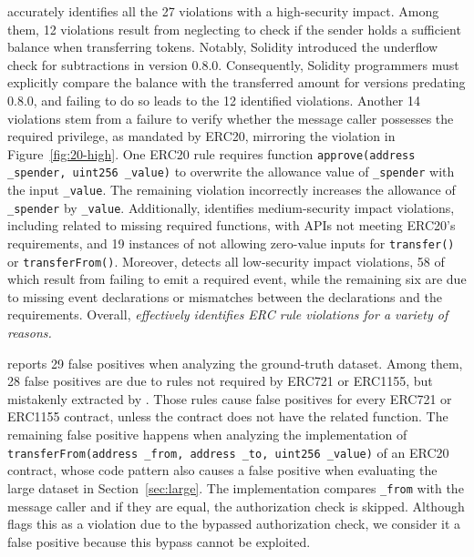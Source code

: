 accurately identifies all the 27 violations with a high-security impact. 
Among them, 12 violations result from neglecting 
to check if the sender holds a sufficient balance 
when transferring tokens. Notably, Solidity 
introduced the underflow check for subtractions 
in version 0.8.0. Consequently, Solidity 
programmers must explicitly compare the balance with 
the transferred amount for versions predating 0.8.0, 
and failing to do so leads to the 12 identified 
violations.
Another 14 violations stem from a failure to verify whether the message caller possesses the required privilege, as mandated by ERC20,
mirroring the violation in Figure~\ref{fig:20-high}. 
One ERC20 rule requires function \texttt{approve(address \_spender, uint256 \_value)} to overwrite the allowance value of \texttt{\_spender}
with the input \texttt{\_value}.
The remaining violation incorrectly increases the allowance of \texttt{\_spender} by \texttt{\_value}.  
Additionally, \Tool{} identifies   medium-security impact violations, 
including  related to missing required functions, 
 with APIs not meeting ERC20's requirements, 
and 19 instances of not allowing zero-value inputs for \texttt{transfer()} 
or \texttt{transferFrom()}. Moreover, \Tool{} detects all low-security impact violations, 
58 of which result from failing to emit a required event, 
while the remaining six are due to missing event declarations 
or mismatches between the declarations and the requirements. 
Overall, \textit{\Tool{} effectively identifies ERC rule violations for a variety of reasons.}

\fi



\Tool{} reports 29 false positives when analyzing the ground-truth dataset. Among them, 28 false positives are due to rules not required 
by ERC721 or ERC1155, but mistakenly extracted by \Tool{}. 
Those rules cause false positives for every ERC721 or ERC1155 contract, 
unless the contract does not have the related function. 
The remaining false positive happens when analyzing 
the implementation of \texttt{transferFrom(address \_from, address \_to, uint256 \_value)} of an ERC20 contract,
whose code pattern also causes a false positive when evaluating the large dataset
in Section~\ref{sec:large}.
The implementation compares \texttt{\_from} with the message caller and if they are equal, 
the authorization check is skipped.
Although \Tool{} flags this as a violation due to the bypassed authorization check, we consider it a false positive because this bypass cannot be exploited.



